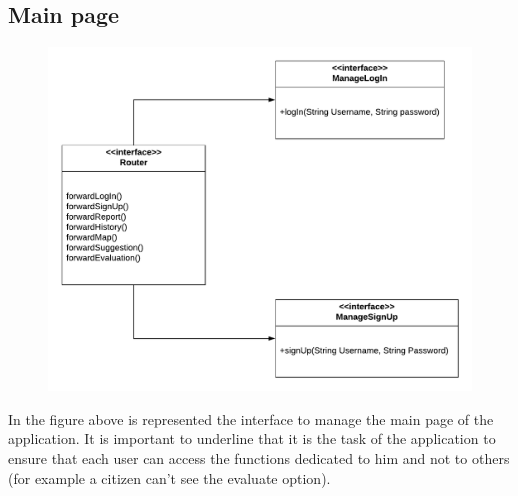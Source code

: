 \documentclass[12pt,a4paper]{report}
\begin{document}
			\subsection{Main page}
				\begin{figure}[H]
						\includegraphics[width = \textwidth, center]{mainInterface}
						\label{fig: interfaces}
				\end{figure}
				\newpage In the figure above is represented the interface to manage the main page of the application.
				It is important to underline that it is the task of the application to ensure that each user can access the
				functions dedicated to him and not to others (for example a citizen can't see the evaluate option).
\end{document}
